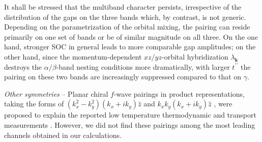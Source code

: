 \documentclass[aps,prl,twocolumn,superscriptaddress,showpacs]{revtex4-1}
\newcommand{\bs}{\boldsymbol}
\begin{document}

It shall be stressed that the multiband character persists, irrespective of the distribution of the gaps on the three bands which, by contrast, is not generic. Depending on the parametrization of the orbital mixing, the pairing can reside primarily on one set of bands or be of similar magnitude on all three. On the one hand, stronger SOC in general leads to more comparable gap amplitudes; on the other hand, since the momentum-dependent $xz/yz$-orbital hybridization $\lambda_{\bs k}$ destroys the $\alpha/\beta$-band nesting conditions more dramatically, with larger $t^{\prime\prime}$ the pairing on these two bands are increasingly suppressed compared to that on $\gamma$.


{\it Other symmetries} -- Planar chiral $f$-wave pairings in product representations, taking the forms of $(k_x^2 -k_y^2)(k_x+ik_y)\hat{z}$ and $k_xk_y(k_x+ik_y)\hat{z}$ \cite{Hasegawa:00,Graf:00}, were proposed to explain the reported low temperature thermodynamic and transport measurements \cite{Ishida:97,NishiZaki:00,Hassinger:16}. However, we did not find these pairings among the most leading channels obtained in our calculations.



\end{document}
